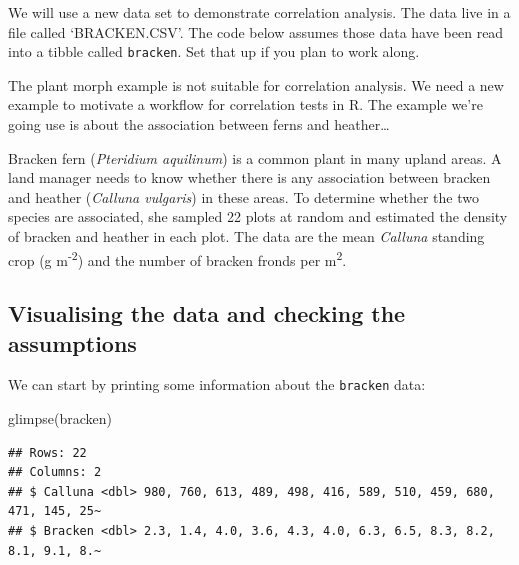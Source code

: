 \documentclass[
]{book}
\newenvironment{Shaded}{\begin{snugshade}}{\end{snugshade}}
\newcommand{\FunctionTok}[1]{\textcolor[rgb]{0.00,0.00,0.00}{#1}}
\newcommand{\NormalTok}[1]{#1}
\newenvironment{greybox}{
  \definecolor{shadecolor}{rgb}{0.95,0.95,0.95}  %
  \color{black}
  \begin{shaded}}
 {\end{shaded}}
\newenvironment{infobox}[1]
  {
  \begin{itemize}
  \renewcommand{\labelitemi}{
    \raisebox{-.7\height}[0pt][0pt]{
      {\setkeys{Gin}{width=3em,keepaspectratio}
        \texttt{[image: images/\#1]}}
    }
  }
  \setlength{\fboxsep}{1em}
  \begin{greybox}
  \item
  }
  {
  \end{greybox}
  \end{itemize}
  }
\begin{document}
\begin{infobox}{action}

\hypertarget{section-5}{%
\subsubsection*{}\label{section-5}}

We will use a new data set to demonstrate correlation analysis. The data live in a file called `BRACKEN.CSV'. The code below assumes those data have been read into a tibble called \texttt{bracken}. Set that up if you plan to work along.

\end{infobox}

The plant morph example is not suitable for correlation analysis. We need a new example to motivate a workflow for correlation tests in R. The example we're going use is about the association between ferns and heather\ldots{}

Bracken fern (\emph{Pteridium aquilinum}) is a common plant in many upland areas. A land manager needs to know whether there is any association between bracken and heather (\emph{Calluna vulgaris}) in these areas. To determine whether the two species are associated, she sampled 22 plots at random and estimated the density of bracken and heather in each plot. The data are the mean \emph{Calluna} standing crop (g m\textsuperscript{-2}) and the number of bracken fronds per m\textsuperscript{2}.

\hypertarget{visualising-the-data-and-checking-the-assumptions-2}{%
\subsection{Visualising the data and checking the assumptions}\label{visualising-the-data-and-checking-the-assumptions-2}}

We can start by printing some information about the \texttt{bracken} data:

\begin{Shaded}
\begin{Highlighting}[]
\FunctionTok{glimpse}\NormalTok{(bracken)}
\end{Highlighting}
\end{Shaded}

\begin{verbatim}
## Rows: 22
## Columns: 2
## $ Calluna <dbl> 980, 760, 613, 489, 498, 416, 589, 510, 459, 680, 471, 145, 25~
## $ Bracken <dbl> 2.3, 1.4, 4.0, 3.6, 4.3, 4.0, 6.3, 6.5, 8.3, 8.2, 8.1, 9.1, 8.~
\end{verbatim}
\end{document}
